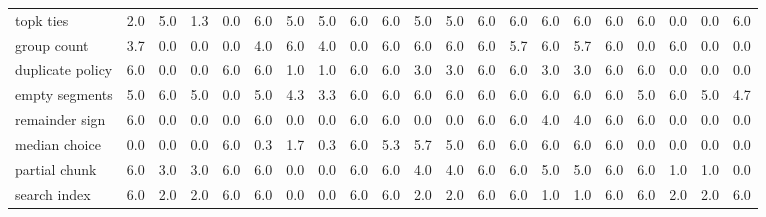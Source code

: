 \begin{table}[!htbp]
\begin{tabular}{lrrrrrrrrrrrrrrrrrrrr}
topk ties & 2.0 & 5.0 & 1.3 & 0.0 & 6.0 & 5.0 & 5.0 & 6.0 & 6.0 & 5.0 & 5.0 & 6.0 & 6.0 & 6.0 & 6.0 & 6.0 & 6.0 & 0.0 & 0.0 & 6.0 \\
group count & 3.7 & 0.0 & 0.0 & 0.0 & 4.0 & 6.0 & 4.0 & 0.0 & 6.0 & 6.0 & 6.0 & 6.0 & 5.7 & 6.0 & 5.7 & 6.0 & 0.0 & 6.0 & 0.0 & 0.0 \\
duplicate policy & 6.0 & 0.0 & 0.0 & 6.0 & 6.0 & 1.0 & 1.0 & 6.0 & 6.0 & 3.0 & 3.0 & 6.0 & 6.0 & 3.0 & 3.0 & 6.0 & 6.0 & 0.0 & 0.0 & 0.0 \\
empty segments & 5.0 & 6.0 & 5.0 & 0.0 & 5.0 & 4.3 & 3.3 & 6.0 & 6.0 & 6.0 & 6.0 & 6.0 & 6.0 & 6.0 & 6.0 & 6.0 & 5.0 & 6.0 & 5.0 & 4.7 \\
remainder sign & 6.0 & 0.0 & 0.0 & 0.0 & 6.0 & 0.0 & 0.0 & 6.0 & 6.0 & 0.0 & 0.0 & 6.0 & 6.0 & 4.0 & 4.0 & 6.0 & 6.0 & 0.0 & 0.0 & 0.0 \\
median choice & 0.0 & 0.0 & 0.0 & 6.0 & 0.3 & 1.7 & 0.3 & 6.0 & 5.3 & 5.7 & 5.0 & 6.0 & 6.0 & 6.0 & 6.0 & 6.0 & 0.0 & 0.0 & 0.0 & 0.0 \\
partial chunk & 6.0 & 3.0 & 3.0 & 6.0 & 6.0 & 0.0 & 0.0 & 6.0 & 6.0 & 4.0 & 4.0 & 6.0 & 6.0 & 5.0 & 5.0 & 6.0 & 6.0 & 1.0 & 1.0 & 0.0 \\
search index & 6.0 & 2.0 & 2.0 & 6.0 & 6.0 & 0.0 & 0.0 & 6.0 & 6.0 & 2.0 & 2.0 & 6.0 & 6.0 & 1.0 & 1.0 & 6.0 & 6.0 & 2.0 & 2.0 & 6.0 \\
\bottomrule
\end{tabular}
\end{table}
